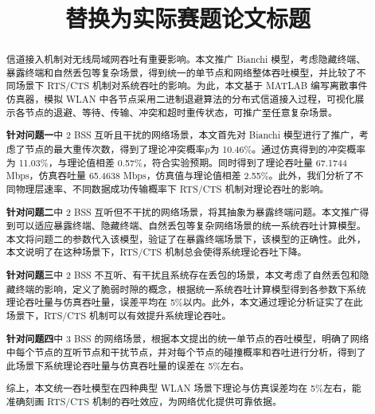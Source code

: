 \documentclass[bwprint]{gmcmthesis}
\title{替换为实际赛题论文标题}
\begin{document}
\label{body:start}

\maketitle

\begin{abstract}\label{abstract:start}
信道接入机制对无线局域网吞吐有重要影响。本文推广 Bianchi 模型，考虑隐藏终端、暴露终端和自然丢包等复杂场景，得到统一的单节点和网络整体吞吐模型，并比较了不同场景下 RTS/CTS 机制对系统吞吐的影响。为此，本文基于 MATLAB 编写离散事件仿真器，模拟 WLAN 中各节点采用二进制退避算法的分布式信道接入过程，可视化展示各节点的退避、等待、传输、冲突和超时重传状态，可推广至任意复杂场景。

\textbf{针对问题一}中 2 BSS 互听且干扰的网络场景，本文首先对 Bianchi 模型进行了推广，考虑了节点的最大重传次数，得到了理论冲突概率$p$为 10.46\%。通过仿真得到的冲突概率为 11.03\%，与理论值相差 0.57\%，符合实验预期。同时得到了理论吞吐量 67.1744 Mbps，仿真吞吐量 65.4638 Mbps，仿真值与理论值相差 2.55\%。此外，我们分析了不同物理层速率、不同数据成功传输概率下 RTS/CTS 机制对理论吞吐的影响。

\textbf{针对问题二}中 2 BSS 互听但不干扰的网络场景，将其抽象为暴露终端问题。本文推广得到可以适应暴露终端、隐藏终端、自然丢包等复杂网络场景的统一系统吞吐计算模型。本文将问题二的参数代入该模型，验证了在暴露终端场景下，该模型的正确性。此外，本文说明了在这种场景下，RTS/CTS 机制总会使得系统理论吞吐下降。

\textbf{针对问题三}中 2 BSS 不互听、有干扰且系统存在丢包的场景，本文考虑了自然丢包和隐藏终端的影响，定义了脆弱时隙的概念，根据统一系统吞吐计算模型得到各参数下系统理论吞吐量与仿真吞吐量，误差平均在 5\%以内。此外，本文通过理论分析证实了在此场景下，RTS/CTS 机制可以有效提升系统理论吞吐。

\textbf{针对问题四}中 3 BSS 的网络场景，根据本文提出的统一单节点的吞吐模型，明确了网络中每个节点的互听节点和干扰节点，并对每个节点的碰撞概率和吞吐进行分析，得到了此场景下系统理论吞吐量与仿真吞吐量的误差在 5\%左右。

综上，本文统一吞吐模型在四种典型 WLAN 场景下理论与仿真误差均在 5\%左右，能准确刻画 RTS/CTS 机制的吞吐效应，为网络优化提供可靠依据。

\label{abstract:end}

\end{abstract}
\end{document}
